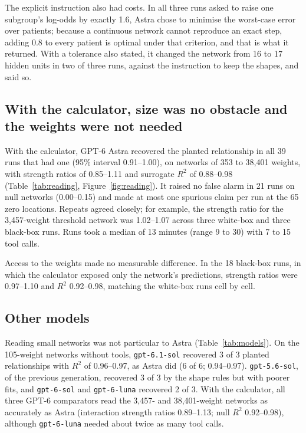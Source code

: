 \documentclass[11pt]{article}
\newcommand{\astra}{GPT-6 Astra}
\begin{document}
The explicit instruction also had costs. In all three runs asked to raise one subgroup's log-odds by exactly 1.6, Astra chose to minimise the worst-case error over patients; because a continuous network cannot reproduce an exact step, adding 0.8 to every patient is optimal under that criterion, and that is what it returned. With a tolerance also stated, it changed the network from 16 to 17 hidden units in two of three runs, against the instruction to keep the shapes, and said so.

\subsection{With the calculator, size was no obstacle and the weights were not needed}

With the calculator, \astra{} recovered the planted relationship in all 39 runs that had one (95\% interval 0.91--1.00), on networks of 353 to 38,401 weights, with strength ratios of 0.85--1.11 and surrogate $R^2$ of 0.88--0.98 (Table~\ref{tab:reading}, Figure~\ref{fig:reading}). It raised no false alarm in 21 runs on null networks (0.00--0.15) and made at most one spurious claim per run at the 65 zero locations. Repeats agreed closely; for example, the strength ratio for the 3,457-weight threshold network was 1.02--1.07 across three white-box and three black-box runs. Runs took a median of 13 minutes (range 9 to 30) with 7 to 15 tool calls.

Access to the weights made no measurable difference. In the 18 black-box runs, in which the calculator exposed only the network's predictions, strength ratios were 0.97--1.10 and $R^2$ 0.92--0.98, matching the white-box runs cell by cell.

\subsection{Other models}

Reading small networks was not particular to Astra (Table~\ref{tab:models}). On the 105-weight networks without tools, \texttt{gpt-6.1-sol} recovered 3 of 3 planted relationships with $R^2$ of 0.96--0.97, as Astra did (6 of 6; 0.94--0.97). \texttt{gpt-5.6-sol}, of the previous generation, recovered 3 of 3 by the shape rules but with poorer fits, and \texttt{gpt-6-sol} and \texttt{gpt-6-luna} recovered 2 of 3. With the calculator, all three GPT-6 comparators read the 3,457- and 38,401-weight networks as accurately as Astra (interaction strength ratios 0.89--1.13; null $R^2$ 0.92--0.98), although \texttt{gpt-6-luna} needed about twice as many tool calls.
\end{document}
